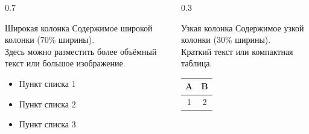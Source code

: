\documentclass[
  xcolor={svgnames},
  hyperref={colorlinks=true,linkcolor=blue}
]{beamer}
\begin{document}
\begin{frame}
  \vspace{1cm}
  \begin{columns}[T, totalwidth=\textwidth]
    \begin{column}{0.7\textwidth}
      \begin{block}{Широкая колонка}
        Содержимое широкой колонки (70\% ширины). \\
        Здесь можно разместить более объёмный текст или большое изображение. \\
        \begin{itemize}
          \item Пункт списка 1
          \item Пункт списка 2
          \item Пункт списка 3
        \end{itemize}
      \end{block}
    \end{column}
    \begin{column}{0.3\textwidth}
      \begin{block}{Узкая колонка}
        Содержимое узкой колонки (30\% ширины). \\
        Краткий текст или компактная таблица. \\
        \begin{tabular}{|c|c|}
          \hline
          A & B \\
          \hline
          1 & 2 \\
          \hline
        \end{tabular}
      \end{block}
    \end{column}
  \end{columns}

\end{frame}
\end{document}
